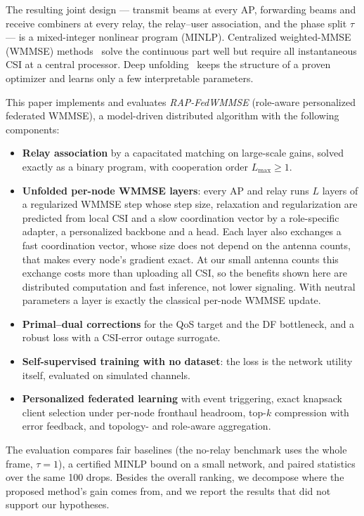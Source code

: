 \documentclass[conference]{IEEEtran}
\begin{document}
The resulting joint design --- transmit beams at every AP, forwarding beams
and receive combiners at every relay, the relay--user association, and the
phase split $\tau$ --- is a mixed-integer nonlinear program (MINLP).
Centralized weighted-MMSE (WMMSE) methods~\cite{shi2011wmmse,%
christensen2008wmmse} solve the continuous part well but require all
instantaneous CSI at a central processor. Deep
unfolding~\cite{monga2021unrolling,chowdhury2021unfolding} keeps the structure
of a proven optimizer and learns only a few interpretable parameters.

This paper implements and evaluates \emph{RAP-FedWMMSE} (role-aware
personalized federated WMMSE), a model-driven distributed algorithm with the
following components:
\begin{itemize}
  \item \textbf{Relay association} by a capacitated matching on large-scale
    gains, solved exactly as a binary program, with cooperation order
    $L_{\max}\ge1$.
  \item \textbf{Unfolded per-node WMMSE layers}: every AP and relay runs $L$
    layers of a regularized WMMSE step whose step size, relaxation and
    regularization are predicted from local CSI and a slow coordination vector
    by a role-specific adapter, a personalized backbone and a head. Each layer
    also exchanges a fast coordination vector, whose size does not depend on
    the antenna counts, that makes every node's gradient exact. At our small
    antenna counts this exchange costs more than uploading all CSI, so the
    benefits shown here are distributed computation and fast inference, not
    lower signaling. With neutral parameters a layer is exactly the classical
    per-node WMMSE update.
  \item \textbf{Primal--dual corrections} for the QoS target and the DF
    bottleneck, and a robust loss with a CSI-error outage surrogate.
  \item \textbf{Self-supervised training with no dataset}: the loss is the
    network utility itself, evaluated on simulated channels.
  \item \textbf{Personalized federated learning} with event triggering, exact
    knapsack client selection under per-node fronthaul headroom, top-$k$
    compression with error feedback, and topology- and role-aware
    aggregation.
\end{itemize}

The evaluation compares fair baselines (the no-relay benchmark uses the whole
frame, $\tau=1$), a certified MINLP bound on a small network, and paired
statistics over the same 100 drops. Besides the overall ranking, we decompose
where the proposed method's gain comes from, and we report the results that
did not support our hypotheses.
\end{document}

